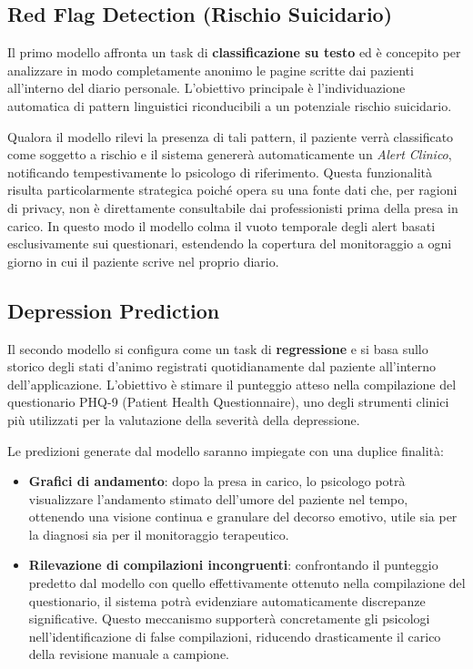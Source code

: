 \subsection{Red Flag Detection (Rischio Suicidario)}
\label{subsec:red_flag}
Il primo modello affronta un task di \textbf{classificazione su testo} ed è concepito per analizzare in modo completamente anonimo le pagine scritte dai pazienti all'interno del diario personale. L'obiettivo principale è l'individuazione automatica di pattern linguistici riconducibili a un potenziale rischio suicidario.

Qualora il modello rilevi la presenza di tali pattern, il paziente verrà classificato come soggetto a rischio e il sistema genererà automaticamente un \textit{Alert Clinico}, notificando tempestivamente lo psicologo di riferimento. Questa funzionalità risulta particolarmente strategica poiché opera su una fonte dati che, per ragioni di privacy, non è direttamente consultabile dai professionisti prima della presa in carico.
In questo modo il modello colma il vuoto temporale degli alert basati esclusivamente sui questionari, estendendo la copertura del monitoraggio a ogni giorno in cui il paziente scrive nel proprio diario.

\subsection{Depression Prediction}
\label{subsec:depression}
Il secondo modello si configura come un task di \textbf{regressione} e si basa sullo storico degli stati d'animo registrati quotidianamente dal paziente all'interno dell'applicazione. L'obiettivo è stimare il punteggio atteso nella compilazione del questionario PHQ-9 (Patient Health Questionnaire), uno degli strumenti clinici più utilizzati per la valutazione della severità della depressione.

Le predizioni generate dal modello saranno impiegate con una duplice finalità:
\begin{itemize}
    \item \textbf{Grafici di andamento}: dopo la presa in carico, lo psicologo potrà visualizzare l'andamento stimato dell'umore del paziente nel tempo, ottenendo una visione continua e granulare del decorso emotivo, utile sia per la diagnosi sia per il monitoraggio terapeutico.
    \item \textbf{Rilevazione di compilazioni incongruenti}: confrontando il punteggio predetto dal modello con quello effettivamente ottenuto nella compilazione del questionario, il sistema potrà evidenziare automaticamente discrepanze significative. Questo meccanismo supporterà concretamente gli psicologi nell'identificazione di false compilazioni, riducendo drasticamente il carico della revisione manuale a campione.
\end{itemize}

